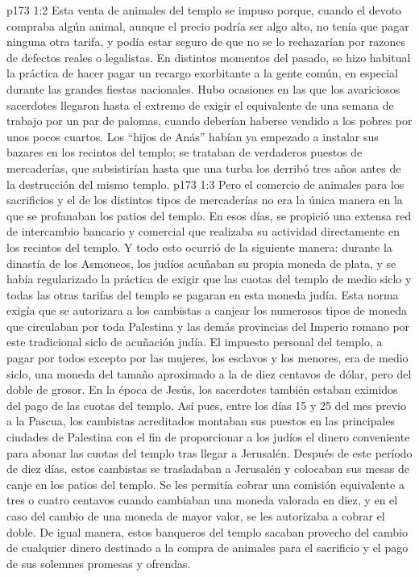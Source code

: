 \vs p173 1:2 Esta venta de animales del templo se impuso porque, cuando el devoto compraba algún animal, aunque el precio podría ser algo alto, no tenía que pagar ninguna otra tarifa, y podía estar seguro de que no se lo rechazarían por razones de defectos reales o legalistas. En distintos momentos del pasado, se hizo habitual la práctica de hacer pagar un recargo exorbitante a la gente común, en especial durante las grandes fiestas nacionales. Hubo ocasiones en las que los avariciosos sacerdotes llegaron hasta el extremo de exigir el equivalente de una semana de trabajo por un par de palomas, cuando deberían haberse vendido a los pobres por unos pocos cuartos. Los “hijos de Anás” habían ya empezado a instalar sus bazares en los recintos del templo; se trataban de verdaderos puestos de mercaderías, que subsistirían hasta que una turba los derribó tres años antes de la destrucción del mismo templo.
\vs p173 1:3 \pc Pero el comercio de animales para los sacrificios y el de los distintos tipos de mercaderías no era la única manera en la que se profanaban los patios del templo. En esos días, se propició una extensa red de intercambio bancario y comercial que realizaba su actividad directamente en los recintos del templo. Y todo esto ocurrió de la siguiente manera: durante la dinastía de los Asmoneos, los judíos acuñaban su propia moneda de plata, y se había regularizado la práctica de exigir que las cuotas del templo de medio siclo y todas las otras tarifas del templo se pagaran en esta moneda judía. Esta norma exigía que se autorizara a los cambistas a canjear los numerosos tipos de moneda que circulaban por toda Palestina y las demás provincias del Imperio romano por este tradicional siclo de acuñación judía. El impuesto personal del templo, a pagar por todos excepto por las mujeres, los esclavos y los menores, era de medio siclo, una moneda del tamaño aproximado a la de diez centavos de dólar, pero del doble de grosor. En la época de Jesús, los sacerdotes también estaban eximidos del pago de las cuotas del templo. Así pues, entre los días 15 y 25 del mes previo a la Pascua, los cambistas acreditados montaban sus puestos en las principales ciudades de Palestina con el fin de proporcionar a los judíos el dinero conveniente para abonar las cuotas del templo tras llegar a Jerusalén. Después de este período de diez días, estos cambistas se trasladaban a Jerusalén y colocaban sus mesas de canje en los patios del templo. Se les permitía cobrar una comisión equivalente a tres o cuatro centavos cuando cambiaban una moneda valorada en diez, y en el caso del cambio de una moneda de mayor valor, se les autorizaba a cobrar el doble. De igual manera, estos banqueros del templo sacaban provecho del cambio de cualquier dinero destinado a la compra de animales para el sacrificio y el pago de sus solemnes promesas y ofrendas.

